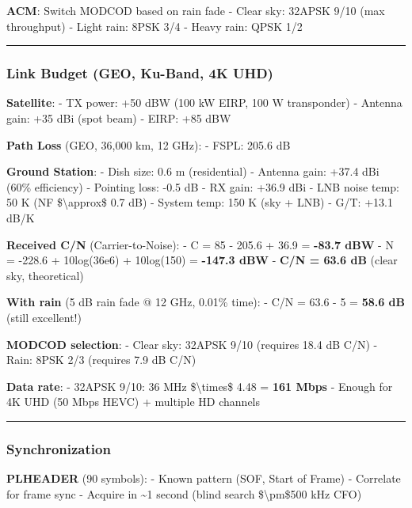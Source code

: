 \textbf{ACM}: Switch MODCOD based on rain fade - Clear sky: 32APSK 9/10
(max throughput) - Light rain: 8PSK 3/4 - Heavy rain: QPSK 1/2

\begin{center}\rule{0.5\linewidth}{0.5pt}\end{center}

\subsubsection{Link Budget (GEO, Ku-Band, 4K
UHD)}\label{link-budget-geo-ku-band-4k-uhd}

\textbf{Satellite}: - TX power: +50 dBW (100 kW EIRP, 100 W transponder)
- Antenna gain: +35 dBi (spot beam) - EIRP: +85 dBW

\textbf{Path Loss} (GEO, 36,000 km, 12 GHz): - FSPL: 205.6 dB

\textbf{Ground Station}: - Dish size: 0.6 m (residential) - Antenna
gain: +37.4 dBi (60\% efficiency) - Pointing loss: -0.5 dB - RX gain:
+36.9 dBi - LNB noise temp: 50 K (NF \$\textbackslash approx\$ 0.7 dB) -
System temp: 150 K (sky + LNB) - G/T: +13.1 dB/K

\textbf{Received C/N} (Carrier-to-Noise): - C = 85 - 205.6 + 36.9 =
\textbf{-83.7 dBW} - N = -228.6 + 10log(36e6) + 10log(150) =
\textbf{-147.3 dBW} - \textbf{C/N = 63.6 dB} (clear sky, theoretical)

\textbf{With rain} (5 dB rain fade @ 12 GHz, 0.01\% time): - C/N = 63.6
- 5 = \textbf{58.6 dB} (still excellent!)

\textbf{MODCOD selection}: - Clear sky: 32APSK 9/10 (requires 18.4 dB
C/N) - Rain: 8PSK 2/3 (requires 7.9 dB C/N)

\textbf{Data rate}: - 32APSK 9/10: 36 MHz \$\textbackslash times\$ 4.48
= \textbf{161 Mbps} - Enough for 4K UHD (50 Mbps HEVC) + multiple HD
channels

\begin{center}\rule{0.5\linewidth}{0.5pt}\end{center}

\subsubsection{Synchronization}\label{synchronization-1}

\textbf{PLHEADER} (90 symbols): - Known pattern (SOF, Start of Frame) -
Correlate for frame sync - Acquire in \textasciitilde1 second (blind
search \$\textbackslash pm\$500 kHz CFO)

